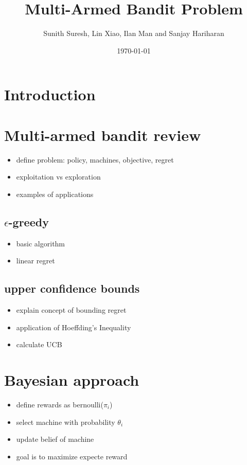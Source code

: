 \documentclass{article}
\title{Multi-Armed Bandit Problem}
\author{Sunith Suresh, Lin Xiao, Ilan Man and Sanjay Hariharan}
\date{\today}
\begin{document}
\maketitle

\section{Introduction}

\section{Multi-armed bandit review}

\begin{itemize}
\item define problem: policy, machines, objective, regret
\item  exploitation vs exploration
\item  examples of applications
\end{itemize}

\subsection{$\epsilon$-greedy}

\begin{itemize}
\item  basic algorithm
\item  linear regret
\end{itemize}

\subsection{upper confidence bounds}

\begin{itemize}
\item  explain concept of bounding regret
\item  application of Hoeffding's Inequality
\item  calculate UCB
\end{itemize}

\section{Bayesian approach}

\begin{itemize}
\item define rewards as bernoulli($\pi_i$)
\item select machine with probability $\theta_i$
\item update belief of machine
\item goal is to maximize expecte reward
\end{itemize}
\end{document}
